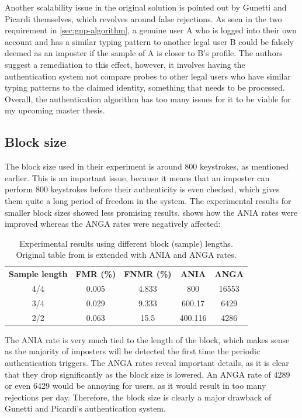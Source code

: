 \documentclass[informationsecurity]{gucmasterproject}
\begin{document}
Another scalability issue in the original solution is pointed out by Gunetti and Picardi themselves, which revolves around false rejections.
As seen in the two requirement in \cref{sec:gnp-algorithm}, a genuine user A who is logged into their own account and has a similar typing pattern to another legal user B could be falsely deemed as an imposter if the sample of A is closer to B's profile.
The authors suggest a remediation to this effect, however, it involves having the authentication system not compare probes to other legal users who have similar typing patterns to the claimed identity, something that needs to be processed.
Overall, the authentication algorithm has too many issues for it to be viable for my upcoming master thesis.

\subsection{Block size}
\label{sec:gnp-blocksizes}
The block size used in their experiment is around 800 keystrokes, as mentioned earlier.
This is an important issue, because it means that an imposter can perform 800 keystrokes before their authenticity is even checked, which gives them quite a long period of freedom in the system.
The experimental results for smaller block sizes showed less promising results. 
 shows how the ANIA rates were improved whereas the ANGA rates were negatively affected:

\begin{table}[h]
\centering
\begin{tabular}{ccccc}
 \bf Sample length & \bf FMR (\%) & \bf FNMR (\%) & \bf ANIA & \bf ANGA \\
 4/4 & 0.005 & 4.833 & 800 & 16553 \\
 3/4 & 0.029 & 9.333 & 600.17 & 6429\\
 2/2 & 0.063 & 15.5 & 400.116 & 4286
\end{tabular}
\caption{Experimental results using different block (sample) lengths. Original table from \cite{gnp} is extended with ANIA and ANGA rates.}
\label{tab:gnp-blocksizes}
\end{table}
The ANIA rate is very much tied to the length of the block, which makes sense as the majority of imposters will be detected the first time the periodic authentication triggers.
The ANGA rates reveal important details, as it is clear that they drop significantly as the block size is lowered.
An ANGA rate of 4289 or even 6429 would be annoying for users, as it would result in too many rejections per day.
Therefore, the block size is clearly a major drawback of Gunetti and Picardi's authentication system.
\end{document}
